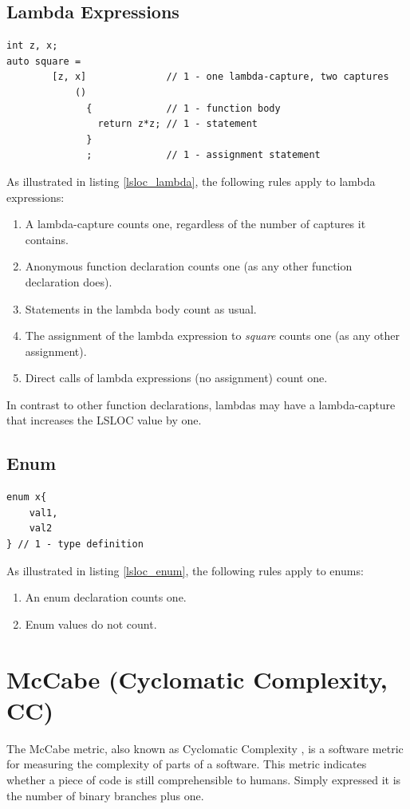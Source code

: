 \documentclass[11pt,a4paper,oneside]{scrreprt}
\begin{document}
\subsection{Lambda Expressions}
\begin{lstlisting}[style=C++0x, caption=Lambda expression code snippet with LSLOC of 4, label=lsloc_lambda]
int z, x;
auto square = 						
		[z, x]				// 1 - one lambda-capture, two captures
			()
			  { 			// 1 - function body
				return z*z;	// 1 - statement
			  }
			  ;				// 1 - assignment statement
\end{lstlisting}

As illustrated in listing \ref{lsloc_lambda}, the following rules apply to lambda expressions:
\begin{enumerate}
\item A lambda-capture counts one, regardless of the number of captures it contains.
\item Anonymous function declaration counts one (as any other function declaration does).
\item Statements in the lambda body count as usual.
\item The assignment of the lambda expression to \textit{square} counts one (as any other assignment).
\item Direct calls of lambda expressions (no assignment) count one.
\end{enumerate}

In contrast to other function declarations, lambdas may have a lambda-capture that increases the LSLOC value by one.

\subsection{Enum}
\begin{lstlisting}[style=C++0x, caption=Enum code snippet with LSLOC of 1, label=lsloc_enum]
enum x{
	val1,
	val2
} // 1 - type definition
\end{lstlisting}

As illustrated in listing \ref{lsloc_enum}, the following rules apply to enums:
\begin{enumerate}
\item An enum declaration counts one.
\item Enum values do not count.
\end{enumerate}

\section{McCabe (Cyclomatic Complexity, CC)}\label{mccabe}
The McCabe metric, also known as Cyclomatic Complexity \cite{mccabe_def}, is a software metric for measuring the complexity of parts of a software. This metric indicates whether a piece of code is still comprehensible to humans. Simply expressed it is the number of binary branches plus one.
\end{document}

